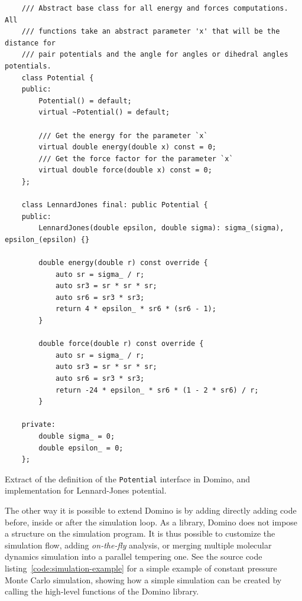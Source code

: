 \documentclass[thesis]{subfiles}
\begin{document}
\begin{listing}[ht]
    \begin{verbatim}
    /// Abstract base class for all energy and forces computations. All
    /// functions take an abstract parameter 'x' that will be the distance for
    /// pair potentials and the angle for angles or dihedral angles potentials.
    class Potential {
    public:
        Potential() = default;
        virtual ~Potential() = default;

        /// Get the energy for the parameter `x`
        virtual double energy(double x) const = 0;
        /// Get the force factor for the parameter `x`
        virtual double force(double x) const = 0;
    };

    class LennardJones final: public Potential {
    public:
        LennardJones(double epsilon, double sigma): sigma_(sigma), epsilon_(epsilon) {}

        double energy(double r) const override {
            auto sr = sigma_ / r;
            auto sr3 = sr * sr * sr;
            auto sr6 = sr3 * sr3;
            return 4 * epsilon_ * sr6 * (sr6 - 1);
        }

        double force(double r) const override {
            auto sr = sigma_ / r;
            auto sr3 = sr * sr * sr;
            auto sr6 = sr3 * sr3;
            return -24 * epsilon_ * sr6 * (1 - 2 * sr6) / r;
        }

    private:
        double sigma_ = 0;
        double epsilon_ = 0;
    };
    \end{verbatim}
    \caption{Extract of the definition of the \texttt{Potential} interface in
    Domino, and implementation for Lennard-Jones potential.}
    \label{code:potential}
\end{listing}

The other way it is possible to extend Domino is by adding directly adding code
before, inside or after the simulation loop. As a library, Domino does not
impose a structure on the simulation program. It is thus possible to customize
the simulation flow, adding \emph{on-the-fly} analysis, or merging multiple
molecular dynamics simulation into a parallel tempering one. See the source code
listing~\ref{code:simulation-example} for a simple example of constant pressure
Monte Carlo simulation, showing how a simple simulation can be created by
calling the high-level functions of the Domino library.
\end{document}
